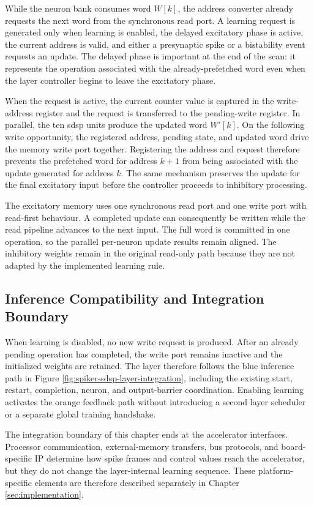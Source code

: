 While the neuron bank consumes word \(W[k]\), the address converter already requests the next word from the synchronous read port. A learning request is generated only when learning is enabled, the delayed excitatory phase is active, the current address is valid, and either a presynaptic spike or a bistability event requests an update. The delayed phase is important at the end of the scan: it represents the operation associated with the already-prefetched word even when the layer controller begins to leave the excitatory phase.

When the request is active, the current counter value is captured in the write-address register and the request is transferred to the pending-write register. In parallel, the ten \gls{sdsp} units produce the updated word \(W'[k]\). On the following write opportunity, the registered address, pending state, and updated word drive the memory write port together. Registering the address and request therefore prevents the prefetched word for address \(k+1\) from being associated with the update generated for address \(k\). The same mechanism preserves the update for the final excitatory input before the controller proceeds to inhibitory processing.

The excitatory memory uses one synchronous read port and one write port with read-first behaviour. A completed update can consequently be written while the read pipeline advances to the next input. The full word is committed in one operation, so the parallel per-neuron update results remain aligned. The inhibitory weights remain in the original read-only path because they are not adapted by the implemented learning rule.

\subsection{Inference Compatibility and Integration Boundary}

When learning is disabled, no new write request is produced. After an already pending operation has completed, the write port remains inactive and the initialized weights are retained. The layer therefore follows the blue inference path in Figure \ref{fig:spiker-sdsp-layer-integration}, including the existing start, restart, completion, neuron, and output-barrier coordination. Enabling learning activates the orange feedback path without introducing a second layer scheduler or a separate global training handshake.

The integration boundary of this chapter ends at the accelerator interfaces. Processor communication, external-memory transfers, bus protocols, and board-specific IP determine how spike frames and control values reach the accelerator, but they do not change the layer-internal learning sequence. These platform-specific elements are therefore described separately in Chapter \ref{sec:implementation}.

